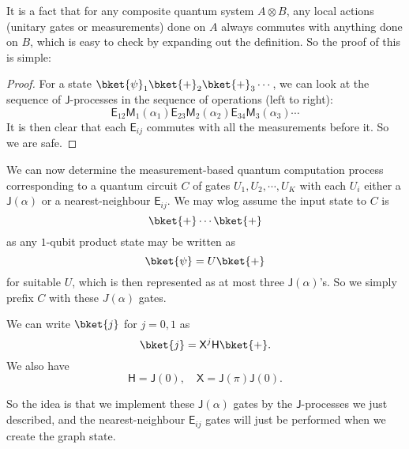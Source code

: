 \documentclass[a4paper]{article}
\newcommand{\qE}{\mathsf{E}}
\newcommand{\qJ}{\mathsf{J}}
\newcommand{\qM}{\mathsf{M}}
\newcommand{\qH}{\mathsf{H}}
\newcommand{\qX}{\mathsf{X}}
\begin{document}
It is a fact that for any composite quantum system $A \otimes B$, any local actions (unitary gates or measurements) done on $A$ always commutes with anything done on $B$, which is easy to check by expanding out the definition. So the proof of this is simple:

\begin{proof}
  For a state $\bket{\psi}_1 \bket{+}_2 \bket{+}_3\cdots$, we can look at the sequence of $\qJ$-processes in the sequence of operations (left to right):
  \[
    \qE_{12} \qM_1(\alpha_1) \qE_{23}\qM_2(\alpha_2) \qE_{34} \qM_3(\alpha_3)\cdots
  \]
  It is then clear that each $\qE_{ij}$ commutes with all the measurements before it. So we are safe.
\end{proof}

We can now determine the measurement-based quantum computation process corresponding to a quantum circuit $C$ of gates $U_1, U_2, \cdots, U_K$ with each $U_i$ either a $\qJ(\alpha)$ or a nearest-neighbour $\qE_{ij}$. We may wlog assume the input state to $C$ is
\[
  \bket{+}\cdots\bket{+}
\]
as any $1$-qubit product state may be written as
\[
  \bket{\psi} = U \bket{+}
\]
for suitable $U$, which is then represented as at most three $\qJ(\alpha)$'s. So we simply prefix $C$ with these $J(\alpha)$ gates.

\begin{eg}
  We can write $\bket{j}$ for $j = 0, 1$ as
  \[
    \bket{j} = \qX^j\qH \bket{+}.
  \]
  We also have
  \[
    \qH = \qJ(0),\quad \qX = \qJ(\pi)\qJ(0).
  \]
\end{eg}

So the idea is that we implement these $\qJ(\alpha)$ gates by the $\qJ$-processes we just described, and the nearest-neighbour $\qE_{ij}$ gates will just be performed when we create the graph state.
\end{document}
